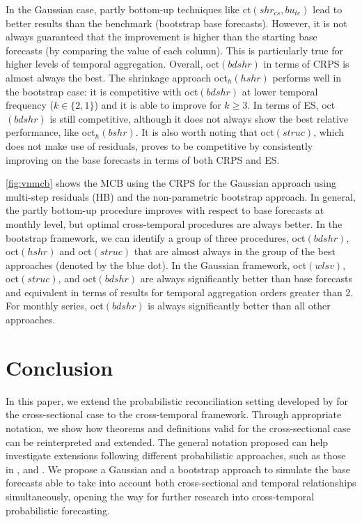 \documentclass[a4paper,11pt]{article}
\theoremstyle{definition}
\begin{document}
In the Gaussian case, partly bottom-up techniques like ct$(shr_{cs}, bu_{te})$ lead to better results than the benchmark (bootstrap base forecasts). However, it is not always guaranteed that the improvement is higher than the starting base forecasts (by comparing the value of each column). This is particularly true for higher levels of temporal aggregation. Overall, oct$(bdshr)$ in terms of CRPS is almost always the best. The shrinkage approach oct$_h(hshr)$ performs well in the bootstrap case: it is competitive with oct$(bdshr)$ at lower temporal frequency ($k \in \{2,1\}$) and it is able to improve for $k\ge 3$. In terms of ES, oct$(bdshr)$ is still competitive, although it does not always show the best relative performance, like oct$_h(bshr)$. 
It is also worth noting that oct$(struc)$, which does not make use of residuals, proves to be competitive by consistently improving on the base forecasts in terms of both CRPS and ES.


\autoref{fig:vnmcb} shows the MCB using the CRPS for the Gaussian approach using multi-step residuals (HB) and the non-parametric bootstrap approach. In general, the partly bottom-up procedure improves with respect to base forecasts at monthly level, but optimal cross-temporal procedures are always better. In the bootstrap framework, we can identify a group of three procedures, oct$(bdshr)$, oct$(hshr)$ and oct$(struc)$ that are almost always in the group of the best approaches (denoted by the blue dot). In the Gaussian framework, oct$(wlsv)$, oct$(struc)$, and oct$(bdshr)$ are always significantly better than base forecasts and equivalent in terms of results for temporal aggregation orders greater than 2. For monthly series, oct$(bdshr)$ is always significantly better than all other approaches.

\section{Conclusion}\label{sec:conclusion}

In this paper, we extend the probabilistic reconciliation setting developed by \cite{panagiotelis2023} for the cross-sectional case to the cross-temporal framework. Through appropriate notation, we show how theorems and definitions valid for the cross-sectional case can be reinterpreted and extended. The general notation proposed can help investigate extensions following different probabilistic approaches, such as those in \cite{jeon2019}, \cite{bentaieb2021} and \cite{corani2022}. We propose a Gaussian and a bootstrap approach to simulate the base forecasts able to take into account both cross-sectional and temporal relationships simultaneously, opening the way for further research into  cross-temporal probabilistic forecasting.
\end{document}
